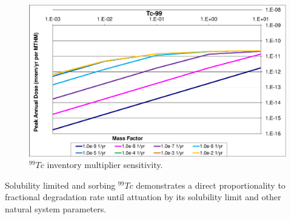 \begin{figure}[ht!]
  \centering
  \includegraphics[width=\linewidth]{99TcMF.eps}
  \caption{$^{99}Tc$ inventory multiplier sensitivity.}
  \label{fig:WFDegTc99MF}
\end{figure}

Solubility limited and sorbing $^{99}Tc$ demonstrates a direct proportionality 
to fractional degradation rate until attuation by its solubility limit and other 
natural system parameters.  

